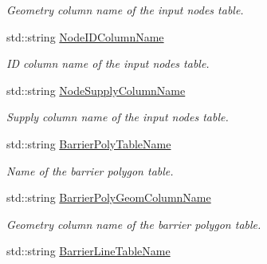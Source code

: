 \begin{DoxyCompactItemize}
\begin{DoxyCompactList}\small\item\em Geometry column name of the input nodes table. \end{DoxyCompactList}\item 
std\+::string \hyperlink{structnetxpert_1_1cnfg_1_1Config_a1faa14bece3cacb0366586674ce177e7}{Node\+I\+D\+Column\+Name}\hypertarget{structnetxpert_1_1cnfg_1_1Config_a1faa14bece3cacb0366586674ce177e7}{}\label{structnetxpert_1_1cnfg_1_1Config_a1faa14bece3cacb0366586674ce177e7}

\begin{DoxyCompactList}\small\item\em ID column name of the input nodes table. \end{DoxyCompactList}\item 
std\+::string \hyperlink{structnetxpert_1_1cnfg_1_1Config_a27ffb6532db544982eda53d2b3aad656}{Node\+Supply\+Column\+Name}\hypertarget{structnetxpert_1_1cnfg_1_1Config_a27ffb6532db544982eda53d2b3aad656}{}\label{structnetxpert_1_1cnfg_1_1Config_a27ffb6532db544982eda53d2b3aad656}

\begin{DoxyCompactList}\small\item\em Supply column name of the input nodes table. \end{DoxyCompactList}\item 
std\+::string \hyperlink{structnetxpert_1_1cnfg_1_1Config_aa30fa621c656cc1fb53dc7f32a122426}{Barrier\+Poly\+Table\+Name}\hypertarget{structnetxpert_1_1cnfg_1_1Config_aa30fa621c656cc1fb53dc7f32a122426}{}\label{structnetxpert_1_1cnfg_1_1Config_aa30fa621c656cc1fb53dc7f32a122426}

\begin{DoxyCompactList}\small\item\em Name of the barrier polygon table. \end{DoxyCompactList}\item 
std\+::string \hyperlink{structnetxpert_1_1cnfg_1_1Config_ad4dcf3083176c2c7dfdde577cef9b5d9}{Barrier\+Poly\+Geom\+Column\+Name}\hypertarget{structnetxpert_1_1cnfg_1_1Config_ad4dcf3083176c2c7dfdde577cef9b5d9}{}\label{structnetxpert_1_1cnfg_1_1Config_ad4dcf3083176c2c7dfdde577cef9b5d9}

\begin{DoxyCompactList}\small\item\em Geometry column name of the barrier polygon table. \end{DoxyCompactList}\item 
std\+::string \hyperlink{structnetxpert_1_1cnfg_1_1Config_aa352c00d9f5796d2ff964b1982f5f35d}{Barrier\+Line\+Table\+Name}\hypertarget{structnetxpert_1_1cnfg_1_1Config_aa352c00d9f5796d2ff964b1982f5f35d}{}\label{structnetxpert_1_1cnfg_1_1Config_aa352c00d9f5796d2ff964b1982f5f35d}


\end{DoxyCompactItemize}
